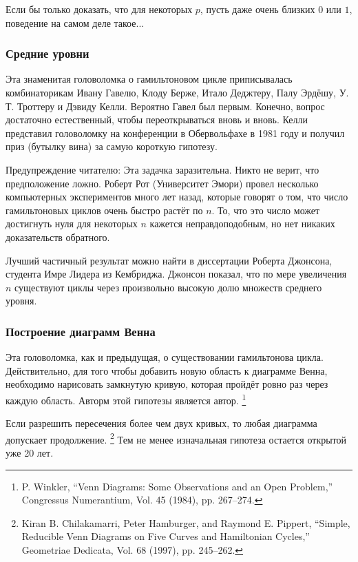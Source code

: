 Если бы только доказать, что для некоторых $p$, пусть даже очень близких $0$ или $1$, поведение на самом деле такое...

\subsubsection*{Средние уровни}

Эта знаменитая головоломка о гамильтоновом цикле приписывалась комбинаторикам Ивану Гавелю, Клоду Берже, Итало Деджтеру, Палу Эрдёшу, У. Т. Троттеру и Дэвиду Келли.
Вероятно Гавел был первым.
Конечно, вопрос достаточно естественный, чтобы переоткрываться вновь и вновь.
Келли представил головоломку на конференции в Обервольфахе в 1981 году и получил приз (бутылку вина) за самую короткую гипотезу.

Предупреждение читателю: Эта задачка заразительна. %
Никто не верит, что предположение ложно.
Роберт Рот (Университет Эмори) провел несколько компьютерных экспериментов много лет назад, которые говорят о том, что число гамильтоновых циклов очень быстро растёт по $n$.
То, что это число может достигнуть нуля для некоторых $n$ кажется неправдоподобным, но нет никаких доказательств обратного.

Лучший частичный результат можно найти в диссертации Роберта Джонсона, студента Имре Лидера из Кембриджа.
Джонсон показал, что по мере увеличения $n$ существуют циклы через произвольно высокую долю множеств среднего уровня.

\subsubsection*{Построение диаграмм Венна}

Эта головоломка, как и предыдущая, о существовании гамильтонова цикла. 
Действительно, для того чтобы добавить новую область к диаграмме Венна, необходимо нарисовать замкнутую кривую, которая пройдёт ровно раз через каждую область.
Авторм этой гипотезы является автор.%
\footnote{P. Winkler, ``Venn Diagrams: Some Observations and an Open Problem,'' Congressus Numerantium, Vol. 45 (1984), pp. 267--274.}

Если разрешить пересечения более чем двух кривых, то любая диаграмма допускает продолжение.%
\footnote{Kiran B. Chilakamarri, Peter Hamburger, and Raymond E. Pippert, ``Simple, Reducible Venn Diagrams on Five Curves and Hamiltonian Cycles,'' Geometriae Dedicata, Vol. 68 (1997), pp. 245--262.}
Тем не менее изначальная гипотеза остается открытой уже 20 лет.

